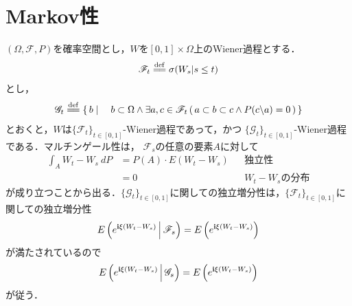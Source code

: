 \section{Markov性}
	$(\Omega,\mathscr{F},P)$を確率空間とし，$W$を$[0,1] \times \Omega$上のWiener過程とする．
	\begin{align}
		\mathscr{F}_{t} \defeq \sigma(W_{s}|s \leq t)
	\end{align}
	とし，
	\begin{align}
		\mathscr{G}_{t} \defeq \Set{b}{b \subset \Omega \wedge \exists a,c \in \mathscr{F}_{t}\,
		(\, a \subset b \subset c \wedge P(c \backslash a) = 0\, )}
	\end{align}
	とおくと，$W$は$\{\mathscr{F}_{t}\}_{t \in [0,1]}$-Wiener過程であって，かつ
	$\{\mathscr{G}_{t}\}_{t \in [0,1]}$-Wiener過程である．マルチンゲール性は，
	$\mathscr{F}_{s}$の任意の要素$A$に対して
	\begin{align}
		\int_{A} W_{t} - W_{s}\ dP &= P(A) \cdot E(W_{t} - W_{s}) && \mbox{独立性} \\
		&= 0 && \mbox{$W_{t} - W_{s}$の分布}
	\end{align}
	が成り立つことから出る．$\{\mathscr{G}_{t}\}_{t \in [0,1]}$に関しての独立増分性は，$\{\mathscr{F}_{t}\}_{t \in [0,1]}$に関しての独立増分性
	\begin{align}
		E\left( e^{\mathbf{i} \xi (W_{t} - W_{s})} \, \middle|\, \mathscr{F}_{s} \right) = E\left(e^{\mathbf{i} \xi (W_{t} - W_{s})}\right)
	\end{align}
	が満たされているので
	\begin{align}
		E\left( e^{\mathbf{i} \xi (W_{t} - W_{s})} \, \middle|\, \mathscr{G}_{s} \right) = E\left(e^{\mathbf{i} \xi (W_{t} - W_{s})}\right)
	\end{align}
	が従う．
	
	